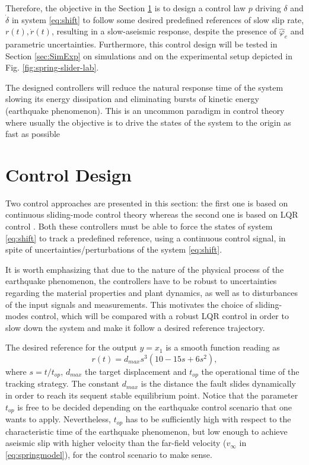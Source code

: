 \documentclass[journal,twoside,web]{ieeecolor}
\begin{document}
Therefore, the objective in the Section \ref{sec:Control} is to design a control law $p$ driving $\delta$ and $\dot{\delta}$ in system \eqref{eq:shift} to follow some desired predefined references of slow slip rate, $r(t),\dot{r}(t)$, resulting in a slow-aseismic response, despite the presence of $\hat{\varphi}_e$ and parametric uncertainties. Furthermore, this control design will be tested in Section \ref{sec:SimExp} on simulations and on the experimental setup depicted in Fig. \ref{fig:spring-slider-lab}.

The designed controllers will reduce the natural response time of the system slowing its energy dissipation and eliminating bursts of kinetic energy (earthquake phenomenon). This is an uncommon paradigm in control theory where usually the objective is to drive the states of the system to the origin as fast as possible

\section{Control Design}
\label{sec:Control}

Two control approaches are presented in this section: the first one is based on continuous sliding-mode control theory \cite{b:Torres-Sanchez-Fridman-Moreno,b:Moreno_2016} whereas the second one is based on LQR control \cite{b:Kalman-1960}. Both these controllers must be able to force the states of system \eqref{eq:shift} to track a predefined reference, using a continuous control signal, in spite of uncertainties/perturbations of the system \eqref{eq:shift}.

It is worth emphasizing that due to the nature of the physical process of the earthquake phenomenon, the controllers have to be robust to uncertainties regarding the material properties and plant dynamics, as well as to disturbances of the input signals and measurements. This motivates the choice of sliding-modes control, which will be compared with a robust LQR control in order to slow down the system and make it follow a desired reference trajectory.

The desired reference for the output $y=x_1$ is a smooth function reading as
\begin{equation}
    r(t) = d_{max}s^3(10-15s+6s^2),
  \label{eq:ref}
\end{equation}
where $s = t/t_{op}$, $d_{max}$ the target displacement and $t_{op}$ the operational time of the tracking strategy. The constant $d_{max}$ is the distance the fault slides dynamically in order to reach its sequent stable equilibrium point. Notice that the parameter $t_{op}$ is free to be decided depending on the earthquake control scenario that one wants to apply. Nevertheless, $t_{op}$ has to be sufficiently high with respect to the characteristic time of the earthquake phenomenon, but low enough to achieve aseismic slip with  higher velocity than the far-field velocity ($v_\infty$ in \eqref{eq:springmodel}), for the control scenario to make sense.
\end{document}
